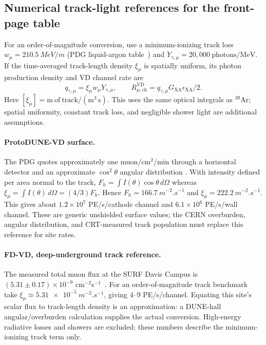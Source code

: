 \subsection{Numerical track-light references for the front-page table}
\label{sec:cosmicnumbers}

For an order-of-magnitude conversion, use a minimum-ionizing track loss
$w_\mu=\SI{210.5}{MeV/m}$ (PDG liquid-argon table~\cite{pdg_argon}) and
$Y_{\gamma,\mu}=20{,}000\ \mathrm{photons/MeV}$. If the time-averaged
track-length density $\xi_\mu$ is spatially uniform, its photon production
 density and VD channel rate are
\begin{equation}
q_{\gamma,\mu}=\xi_\mu w_\mu Y_{\gamma,\mu},\qquad
R_{\mu,\mathrm{ch}}^{\mathrm{VD}}
=q_{\gamma,\mu}G_{\mathrm{XA}}\epsilon_{\mathrm{XA}}/2.
\label{eq:uniformmu}
\end{equation}
Here $[\xi_\mu]=\mathrm{m\ of\ track}/(\mathrm{m^3\,s})$.
This uses the same optical integrals as $^{39}$Ar; spatial uniformity,
constant track loss, and negligible shower light are additional assumptions.

\paragraph{ProtoDUNE-VD surface.}
The PDG quotes approximately one muon/cm$^2$/min through a horizontal
 detector and an approximate $\cos^2\theta$ angular distribution
\cite{pdg_cosmic}. With intensity defined per area normal to the track,
$F_h=\int I(\theta)\cos\theta\,d\Omega$ whereas
$\xi_\mu=\int I(\theta)\,d\Omega=(4/3)F_h$. Hence
$F_h=\SI{166.7}{m^{-2}.s^{-1}}$ and
$\xi_\mu=\SI{222.2}{m^{-2}.s^{-1}}$. This gives about
$1.2\times10^7$ PE/s/cathode channel and $6.1\times10^6$ PE/s/wall channel.
These are generic unshielded surface values; the CERN overburden, angular distribution,
and CRT-measured track population must replace this reference for site rates.

\paragraph{FD-VD, deep-underground track reference.}
The measured total muon flux at the SURF Davis Campus is
$(5.31\pm0.17)\times10^{-9}$ cm$^{-2}$s$^{-1}$~\cite{surf_muons}.
For an order-of-magnitude track benchmark take
$\xi_\mu\simeq\SI{5.31e-5}{m^{-2}.s^{-1}}$, giving
4--9 PE/s/channel. Equating this site's scalar flux to track-length density
is an approximation: a DUNE-hall angular/overburden calculation supplies the
actual conversion. High-energy radiative losses and showers are excluded;
these numbers describe the minimum-ionizing track term only.

